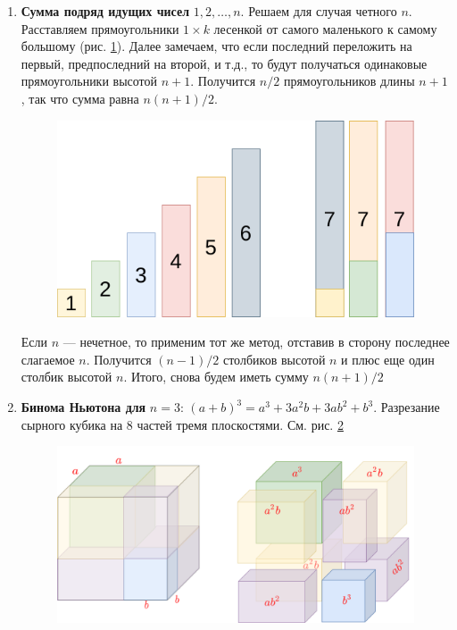 \begin{enumerate}
\item \textbf{Сумма подряд идущих чисел} $1,2,\dots,n$. Решаем для случая четного $n$.
Расставляем прямоугольники $1\times k$ лесенкой от самого маленького к самому большому (рис. \ref{ariphm}). Далее замечаем, что если последний переложить на первый, предпоследний на второй, и т.д., то будут получаться одинаковые прямоугольники высотой $n+1$. Получится $n/2$ прямоугольников длины $n+1$, так что сумма равна $n(n+1)/2$.

\begin{figure}[hbt!]
\begin{center}
\includegraphics[scale=0.2]{ariphm.png}
\end{center}
\caption{}\label{ariphm}
\end{figure}

Если $n$ --- нечетное, то применим тот же метод, отставив в сторону последнее слагаемое $n$. Получится $(n-1)/2$ столбиков высотой $n$ и плюс еще один столбик высотой $n$. Итого, снова будем иметь сумму $n(n+1)/2$

\item \textbf{Бинома Ньютона для} $n=3$: $(a+b)^3 = a^3+3a^2b+3ab^2+b^3$. Разрезание сырного кубика на 8 частей тремя плоскостями. См. рис. \ref{kub}

\begin{figure}[hbt!]
\begin{center}
\includegraphics[scale=0.25]{kub.png}
\end{center}
\caption{}\label{kub}
\end{figure}
\end{enumerate}

